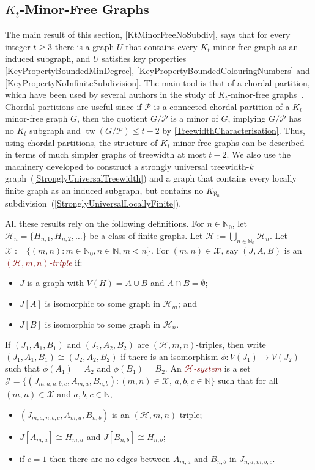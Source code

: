 \documentclass[a4paper,11pt]{article}
\makeatletter
\newcommand{\hdefn}[2]{\textcolor{Maroon}{\emph{#1-#2}}\index{#2@#1-#2}}
\theoremstyle{plain}
\theoremstyle{definition}
\renewcommand{\geq}{\geqslant}
\renewcommand{\leq}{\leqslant}
\DeclareMathOperator{\tw}{tw}
\newcommand{\XX}{\mathcal{X}}
\newcommand{\HH}{\mathcal{H}}
\newcommand{\JJ}{\mathcal{J}}
\newcommand{\NN}{\mathbb{N}}
\newcommand{\PART}{\mathcal{P}}
\makeatother
\begin{document}
\subsection{$K_t$-Minor-Free Graphs}
\label{ExcludedMinorNoSubdiv}

The main result of this section, \cref{KtMinorFreeNoSubdiv}, says that for every  integer $t\geq 3$ there is a graph $U$ that contains every $K_t$-minor-free graph as an induced subgraph, and $U$ satisfies key properties \cref{KeyPropertyBoundedMinDegree}, \cref{KeyPropertyBoundedColouringNumbers}
and \cref{KeyPropertyNoInfiniteSubdivision}. The main tool is that of a chordal partition, which have been used by several authors in the study of $K_t$-minor-free graphs~\cite{ReedSeymour-JCTB98,vdHW18,Andreae86,HOQRS17,SSW19}. Chordal partitions are useful since if $\PART$ is a connected chordal partition of a $K_t$-minor-free graph $G$, then the quotient $G/\PART$ is a minor of $G$, implying $G/\PART$ has no $K_t$ subgraph and $\tw(G/\mathcal{P})\leq t-2$ by \cref{TreewidthCharacterisation}. Thus, using chordal partitions, the structure of $K_t$-minor-free graphs can be described in terms of much simpler graphs of treewidth at most $t-2$. We also use the machinery developed to construct a strongly universal treewidth-$k$ graph~(\cref{StronglyUniversalTreewidth}) and a graph that contains every locally finite graph as an induced subgraph, but contains no $K_{\aleph_0}$ subdivision~(\cref{StronglyUniversalLocallyFinite}).

All these results rely on the following definitions. For $n\in\NN_0$, let $\HH_n=\{H_{n,1},H_{n,2},\dots\}$ be a class of finite graphs. Let $\HH:=\bigcup_{n\in\NN_0}\HH_n$. 
Let $\XX:=\{(m,n):m\in\NN_0,n\in\NN,m<n\}$. 
For $(m,n)\in \XX$, say $(J,A,B)$ is an \hdefn{$(\HH,m,n)$}{triple} if:
\begin{itemize}
    \item $J$ is a graph with $V(H)=A\cup B$ and $A\cap B=\emptyset$;
    \item $J[A]$ is isomorphic to some graph in $\HH_m$; and 
    \item $J[B]$ is isomorphic to some graph in $\HH_n$.
\end{itemize}
If $(J_1,A_1,B_1)$ and $(J_2,A_2,B_2)$ are $(\HH,m,n)$-triples, then write $(J_1,A_1,B_1)\cong (J_2,A_2,B_2)$ if there is an isomorphism $\phi:V(J_1)\to V(J_2)$ such that $\phi(A_1)=A_2$ and $\phi(B_1)=B_2$. 
An \hdefn{$\HH$}{system} is a set 
$\JJ=\{ (J_{m,a,n,b,c},A_{m,a},B_{n,b}) :(m,n)\in\XX,\,a,b,c\in\NN\}$ such that for all $(m,n)\in \XX$ and $a,b,c\in\NN$, 
\begin{itemize}
\item $(J_{m,a,n,b,c},A_{m,a},B_{n,b})$ is an $(\HH,m,n)$-triple;
\item  $J[A_{m,a}]\cong H_{m,a}$ and $J[B_{n,b}]\cong H_{n,b}$;
\item if $c=1$ then there are no edges between $A_{m,a}$ and $B_{n,b}$ in $J_{n,a,m,b,c}$.
 \end{itemize}
\end{document}
